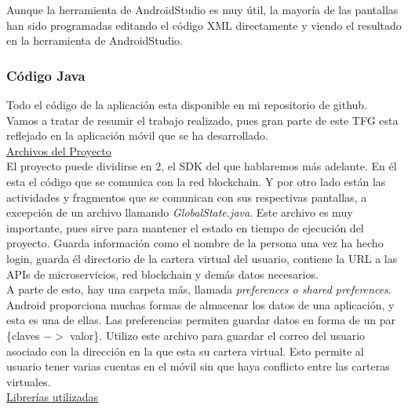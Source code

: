Aunque la herramienta de AndroidStudio es muy útil, la mayoría de las pantallas han sido programadas editando el código XML directamente y viendo el resultado en la herramienta de AndroidStudio.

\subsubsection{Código Java}

Todo el código de la aplicación esta disponible en mi repositorio de github\cite{forgis98}. Vamos a tratar de resumir el trabajo realizado, pues gran parte de este TFG esta reflejado en la aplicación móvil que se ha desarrollado. \\

\underline{Archivos del Proyecto} \\

El proyecto puede dividirse en 2, el SDK del que hablaremos más adelante. En él esta el código que se comunica con la red blockchain. Y por otro lado están las actividades y fragmentos que se comunican con sus respectivas pantallas, a excepción de un archivo llamando \emph{GlobalState.java}. Este archivo es muy importante, pues sirve para mantener el estado en tiempo de ejecución del proyecto. Guarda información como el nombre de la persona una vez ha hecho login, guarda él directorio de la cartera virtual del usuario, contiene la URL a las APIs de microservicios, red blockchain y demás datos necesarios. \\

A parte de esto, hay una carpeta más, llamada \emph{preferences o shared preferences}. Android proporciona muchas formas de almacenar los datos de una aplicación, y esta es una de ellas. Las preferencias permiten guardar datos en forma de un par \{claves $->$ valor\}. Utilizo este archivo para guardar el correo del usuario asociado con la dirección en la que esta su cartera virtual. Esto permite al usuario tener varias cuentas en el móvil sin que haya conflicto entre las carteras virtuales. \\

\underline{Librerías utilizadas} \\

